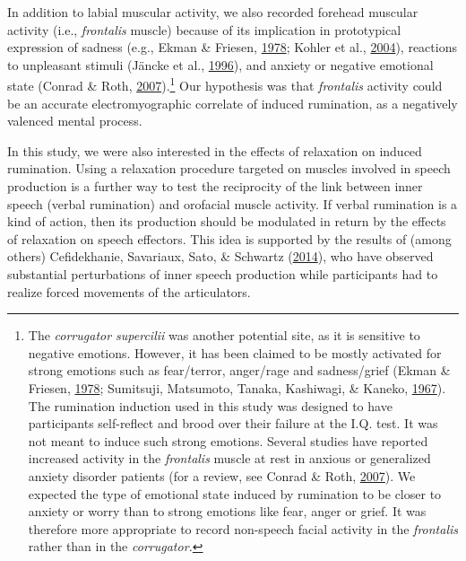 \documentclass[a4paper,12pt,twoside,openright,oldfontcommands,final]{memoir}
\let\rmarkdownfootnote\footnote%
\def\footnote{\protect\rmarkdownfootnote}
\begin{document}
In addition to labial muscular activity, we also recorded forehead muscular activity (i.e., \emph{frontalis} muscle) because of its implication in prototypical expression of sadness (e.g., Ekman \& Friesen, \protect\hyperlink{ref-ekman_facial_1978}{1978}; Kohler et al., \protect\hyperlink{ref-kohler_differences_2004}{2004}), reactions to unpleasant stimuli (Jäncke et al., \protect\hyperlink{ref-Jancke1996}{1996}), and anxiety or negative emotional state (Conrad \& Roth, \protect\hyperlink{ref-conrad_muscle_2007}{2007}).\footnote{The \emph{corrugator supercilii} was another potential site, as it is sensitive to negative emotions. However, it has been claimed to be mostly activated for strong emotions such as fear/terror, anger/rage and sadness/grief (Ekman \& Friesen, \protect\hyperlink{ref-ekman_facial_1978}{1978}; Sumitsuji, Matsumoto, Tanaka, Kashiwagi, \& Kaneko, \protect\hyperlink{ref-sumitsuji_electromyographic_1967}{1967}). The rumination induction used in this study was designed to have participants self-reflect and brood over their failure at the I.Q. test. It was not meant to induce such strong emotions. Several studies have reported increased activity in the \emph{frontalis} muscle at rest in anxious or generalized anxiety disorder patients (for a review, see Conrad \& Roth, \protect\hyperlink{ref-conrad_muscle_2007}{2007}). We expected the type of emotional state induced by rumination to be closer to anxiety or worry than to strong emotions like fear, anger or grief. It was therefore more appropriate to record non-speech facial activity in the \emph{frontalis} rather than in the \emph{corrugator.}} Our hypothesis was that \emph{frontalis} activity could be an accurate electromyographic correlate of induced rumination, as a negatively valenced mental process.

In this study, we were also interested in the effects of relaxation on induced rumination. Using a relaxation procedure targeted on muscles involved in speech production is a further way to test the reciprocity of the link between inner speech (verbal rumination) and orofacial muscle activity. If verbal rumination is a kind of action, then its production should be modulated in return by the effects of relaxation on speech effectors. This idea is supported by the results of (among others) Cefidekhanie, Savariaux, Sato, \& Schwartz (\protect\hyperlink{ref-cefidekhanie_interaction_2014}{2014}), who have observed substantial perturbations of inner speech production while participants had to realize forced movements of the articulators.
\end{document}
